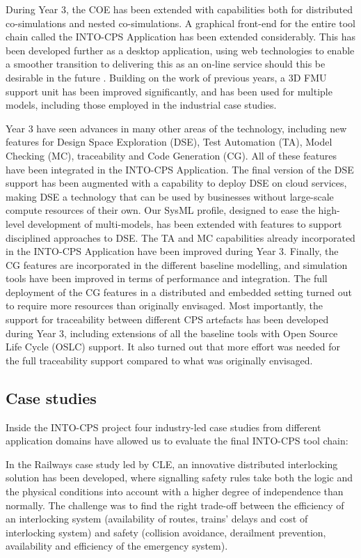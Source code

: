 During Year 3, the COE has been extended with capabilities both for distributed co-simulations and nested co-simulations. A graphical front-end for the entire tool chain called the INTO-CPS Application has been extended considerably. This has been developed further as a desktop application, using web technologies to enable a smoother transition to delivering this as an on-line service should this be desirable in the future . Building on the work of previous years, a 3D FMU support unit has been improved significantly, and has been used for multiple models, including those employed in the industrial case studies.

Year 3 have seen advances in many other areas of the technology, including new features for Design Space Exploration (DSE), Test Automation (TA), Model Checking (MC), traceability and Code Generation (CG). All of these features have been integrated in the INTO-CPS Application. The final version of the DSE support has been augmented with a capability to deploy DSE on cloud services, making DSE a technology that can be used by businesses without large-scale compute resources of their own. Our SysML profile, designed to ease the high-level development of multi-models, has been extended with features to support disciplined approaches to DSE. The TA and MC capabilities already incorporated in the INTO-CPS Application have been improved during Year 3. Finally, the CG features are incorporated in the different baseline modelling, and simulation tools have been improved in terms of performance and integration. The full deployment of the CG features in a distributed and embedded setting turned out to require more resources than originally envisaged. Most importantly, the support for traceability between different CPS artefacts has been developed during Year 3, including extensions of all the baseline tools with Open Source Life Cycle (OSLC) support. It also turned out that more effort was needed for the full traceability support compared to what was originally envisaged.

\subsection{Case studies}
Inside the INTO-CPS project four industry-led case studies from different application domains have allowed us to evaluate the final INTO-CPS tool chain:

In the Railways case study led by CLE, an innovative distributed interlocking solution has been developed, where signalling safety rules take both the logic and the physical conditions into account with a higher degree of independence than normally. The challenge was to find the right trade-off between the efficiency of an interlocking system (availability of routes, trains' delays and cost of interlocking system) and safety (collision avoidance, derailment prevention, availability and efficiency of the emergency system).

